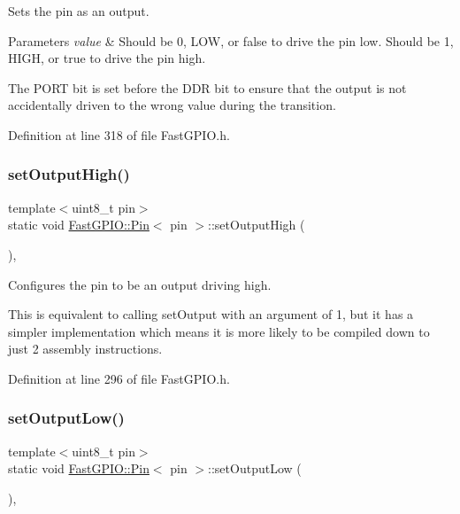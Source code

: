 Sets the pin as an output. 


\begin{DoxyParams}{Parameters}
{\em value} & Should be 0, L\+OW, or false to drive the pin low. Should be 1, H\+I\+GH, or true to drive the pin high.\\
\hline
\end{DoxyParams}
The P\+O\+RT bit is set before the D\+DR bit to ensure that the output is not accidentally driven to the wrong value during the transition. 

Definition at line 318 of file Fast\+G\+P\+I\+O.\+h.

\mbox{\label{class_fast_g_p_i_o_1_1_pin_aaa0032dcb76492716f477d60721a0579}} 
\subsubsection{\texorpdfstring{set\+Output\+High()}{setOutputHigh()}}
{\footnotesize\ttfamily template$<$uint8\+\_\+t pin$>$ \\
static void \hyperlink{class_fast_g_p_i_o_1_1_pin}{Fast\+G\+P\+I\+O\+::\+Pin}$<$ pin $>$\+::set\+Output\+High (\begin{DoxyParamCaption}{ }\end{DoxyParamCaption})\hspace{0.3cm}{\ttfamily [inline]}, {\ttfamily [static]}}



Configures the pin to be an output driving high. 

This is equivalent to calling set\+Output with an argument of 1, but it has a simpler implementation which means it is more likely to be compiled down to just 2 assembly instructions. 

Definition at line 296 of file Fast\+G\+P\+I\+O.\+h.

\mbox{\label{class_fast_g_p_i_o_1_1_pin_a557f119d37b84f3f521d7cbd4cc27b21}} 
\subsubsection{\texorpdfstring{set\+Output\+Low()}{setOutputLow()}}
{\footnotesize\ttfamily template$<$uint8\+\_\+t pin$>$ \\
static void \hyperlink{class_fast_g_p_i_o_1_1_pin}{Fast\+G\+P\+I\+O\+::\+Pin}$<$ pin $>$\+::set\+Output\+Low (\begin{DoxyParamCaption}{ }\end{DoxyParamCaption})\hspace{0.3cm}{\ttfamily [inline]}, {\ttfamily [static]}}



